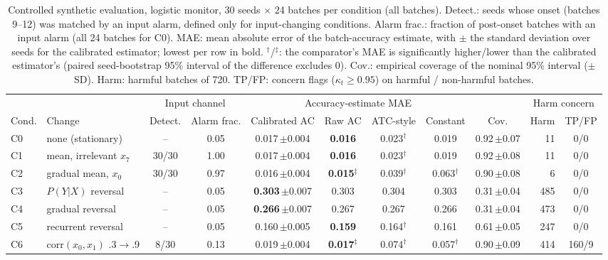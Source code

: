 \begin{table}[t]
\centering
\caption{Controlled synthetic evaluation, logistic monitor, 30 seeds $\times$ 24 batches per condition (all batches). Detect.: seeds whose onset (batches 9--12) was matched by an input alarm, defined only for input-changing conditions. Alarm frac.: fraction of post-onset batches with an input alarm (all 24 batches for C0). MAE: mean absolute error of the batch-accuracy estimate, with $\pm$ the standard deviation over seeds for the calibrated estimator; lowest per row in bold. $^{\dagger}$/$^{\ddagger}$: the comparator's MAE is significantly higher/lower than the calibrated estimator's (paired seed-bootstrap 95\% interval of the difference excludes 0). Cov.: empirical coverage of the nominal 95\% interval ($\pm$ SD). Harm: harmful batches of 720. TP/FP: concern flags ($\kappa_t\ge0.95$) on harmful / non-harmful batches.}
\label{tab:core}
\setlength{\tabcolsep}{3.5pt}
\begin{tabular}{llcccccccrc}
\toprule
 & & \multicolumn{2}{c}{Input channel} & \multicolumn{4}{c}{Accuracy-estimate MAE} & & \multicolumn{2}{c}{Harm concern} \\
\cmidrule(lr){3-4}\cmidrule(lr){5-8}\cmidrule(lr){10-11}
Cond. & Change & Detect. & Alarm frac. & Calibrated AC & Raw AC & ATC-style & Constant & Cov. & Harm & TP/FP \\
\midrule
C0 & none (stationary) & -- & 0.05 & 0.017\,{\scriptsize$\pm$0.004} & \textbf{0.016} & 0.023$^{\dagger}$ & 0.019 & 0.92\,{\scriptsize$\pm$0.07} & 11 & 0/0 \\
C1 & mean, irrelevant $x_7$ & 30/30 & 1.00 & 0.017\,{\scriptsize$\pm$0.004} & \textbf{0.016} & 0.023$^{\dagger}$ & 0.019 & 0.92\,{\scriptsize$\pm$0.08} & 11 & 0/0 \\
C2 & gradual mean, $x_0$ & 30/30 & 0.97 & 0.016\,{\scriptsize$\pm$0.004} & \textbf{0.015}$^{\ddagger}$ & 0.039$^{\dagger}$ & 0.063$^{\dagger}$ & 0.90\,{\scriptsize$\pm$0.08} & 6 & 0/0 \\
C3 & $P(Y|X)$ reversal & -- & 0.05 & \textbf{0.303}\,{\scriptsize$\pm$0.007} & 0.303 & 0.304 & 0.303 & 0.31\,{\scriptsize$\pm$0.04} & 485 & 0/0 \\
C4 & gradual reversal & -- & 0.05 & \textbf{0.266}\,{\scriptsize$\pm$0.007} & 0.267 & 0.267 & 0.266 & 0.31\,{\scriptsize$\pm$0.04} & 473 & 0/0 \\
C5 & recurrent reversal & -- & 0.05 & 0.160\,{\scriptsize$\pm$0.005} & \textbf{0.159} & 0.164$^{\dagger}$ & 0.161 & 0.61\,{\scriptsize$\pm$0.05} & 247 & 0/0 \\
C6 & corr$(x_0,x_1)$ .3$\to$.9 & 8/30 & 0.13 & 0.019\,{\scriptsize$\pm$0.004} & \textbf{0.017}$^{\ddagger}$ & 0.074$^{\dagger}$ & 0.057$^{\dagger}$ & 0.90\,{\scriptsize$\pm$0.09} & 414 & 160/9 \\
\bottomrule
\end{tabular}
\end{table}
